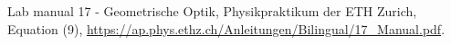 
\begin{thebibliography}{99}




Lab manual 17 - Geometrische Optik, Physikpraktikum der ETH Zurich, Equation (9), \url{https://ap.phys.ethz.ch/Anleitungen/Bilingual/17_Manual.pdf}.

\end{thebibliography}

